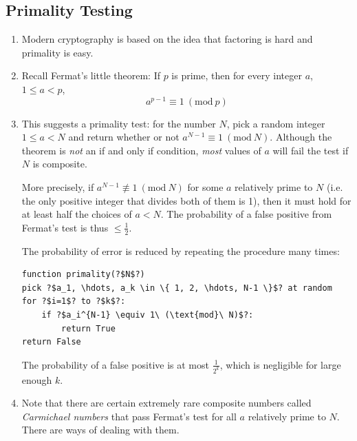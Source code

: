 \documentclass[10pt]{article}
\begin{document}
\begin{multicols}{2}
\begin{addmargin}[0.8em]{0.5em}
    \subsection{Primality Testing}
    \vspace{-0.2cm}
    \begin{enumerate}[label=(\alph*)]
        \item Modern cryptography is based on the idea that factoring is hard and primality is easy. 
        \item Recall Fermat's little theorem: If $p$ is prime, then for every integer $a$, $1 \leq a < p$, 
        $$
        a^{p-1} \equiv 1\ (\text{mod}\ p)
        $$
        
        \item This suggests a primality test: for the number $N$, pick a random integer $1 \leq a < N$ and return whether or not $a^{N-1} \equiv 1\ (\text{mod}\ N)$. Although the theorem is \textit{not} an if and only if condition, \textit{most} values of $a$ will fail the test if $N$ is composite.
        
        More precisely, if $a^{N-1} \not\equiv 1\ (\text{mod}\ N)$ for some $a$ relatively prime to $N$ (i.e. the only positive integer that divides both of them is 1), then it must hold for at least half the choices of $a < N$. The probability of a false positive from Fermat's test is thus $\leq \frac{1}{2}$.
        
        The probability of error is reduced by repeating the procedure many times:
        \begin{verbatim}
function primality(?$N$?)
pick ?$a_1, \hdots, a_k \in \{ 1, 2, \hdots, N-1 \}$? at random
for ?$i=1$? to ?$k$?:
    if ?$a_i^{N-1} \equiv 1\ (\text{mod}\ N)$?:
        return True
return False
        \end{verbatim}     
        The probability of a false positive is at most $\frac{1}{2^k}$, which is negligible for large enough $k$.
        \item Note that there are certain extremely rare composite numbers called \textit{Carmichael numbers} that pass Fermat’s test for all $a$ relatively prime to $N$. There are ways of dealing with them.
    \end{enumerate} 
    \vspace{-0.2cm}

\end{addmargin}
\end{multicols}
\end{document}
